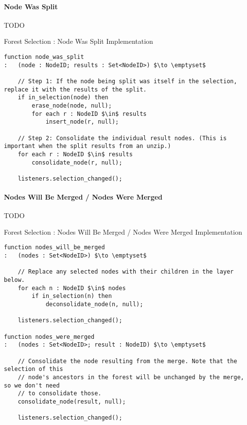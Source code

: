 \paragraph{Node Was Split}

TODO

\begin{stulisting}[p]
\caption{Forest Selection : Node Was Split Implementation}
\label{code:ipfs-selection-nodewassplit}
\begin{lstlisting}[style=Default]
function node_was_split
:	(node : NodeID; results : Set<NodeID>) $\to \emptyset$

	// Step 1: If the node being split was itself in the selection, replace it with the results of the split.
	if in_selection(node) then
		erase_node(node, null);
		for each r : NodeID $\in$ results
			insert_node(r, null);

	// Step 2: Consolidate the individual result nodes. (This is important when the split results from an unzip.)
	for each r : NodeID $\in$ results
		consolidate_node(r, null);

	listeners.selection_changed();
\end{lstlisting}
\end{stulisting}

\paragraph{Nodes Will Be Merged / Nodes Were Merged}

TODO

\begin{stulisting}[p]
\caption{Forest Selection : Nodes Will Be Merged / Nodes Were Merged Implementation}
\label{code:ipfs-selection-nodesmerged}
\begin{lstlisting}[style=Default]
function nodes_will_be_merged
:	(nodes : Set<NodeID>) $\to \emptyset$

	// Replace any selected nodes with their children in the layer below.
	for each n : NodeID $\in$ nodes
		if in_selection(n) then
			deconsolidate_node(n, null);

	listeners.selection_changed();

function nodes_were_merged
:	(nodes : Set<NodeID>; result : NodeID) $\to \emptyset$

	// Consolidate the node resulting from the merge. Note that the selection of this
	// node's ancestors in the forest will be unchanged by the merge, so we don't need
	// to consolidate those.
	consolidate_node(result, null);

	listeners.selection_changed();
\end{lstlisting}
\end{stulisting}

